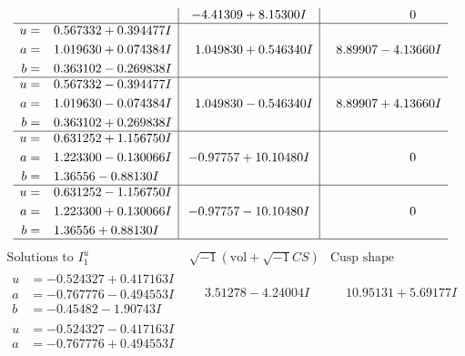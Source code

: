 \documentclass[1p]{elsarticle_modified}
\theoremstyle{definition}
\newcommand{\I}{\sqrt{-1}}
\begin{document}
$$\begin{array}{c|c|c}
 & -4.41309 + 8.15300 I & \phantom{-0.000000 } 0 \\ \hline\begin{aligned}
u &= \phantom{-}0.567332 + 0.394477 I \\
a &= \phantom{-}1.019630 + 0.074384 I \\
b &= \phantom{-}0.363102 - 0.269838 I\end{aligned}
 & \phantom{-}1.049830 + 0.546340 I & \phantom{-}8.89907 - 4.13660 I \\ \hline\begin{aligned}
u &= \phantom{-}0.567332 - 0.394477 I \\
a &= \phantom{-}1.019630 - 0.074384 I \\
b &= \phantom{-}0.363102 + 0.269838 I\end{aligned}
 & \phantom{-}1.049830 - 0.546340 I & \phantom{-}8.89907 + 4.13660 I \\ \hline\begin{aligned}
u &= \phantom{-}0.631252 + 1.156750 I \\
a &= \phantom{-}1.223300 - 0.130066 I \\
b &= \phantom{-}1.36556 - 0.88130 I\end{aligned}
 & -0.97757 + 10.10480 I & \phantom{-0.000000 } 0 \\ \hline\begin{aligned}
u &= \phantom{-}0.631252 - 1.156750 I \\
a &= \phantom{-}1.223300 + 0.130066 I \\
b &= \phantom{-}1.36556 + 0.88130 I\end{aligned}
 & -0.97757 - 10.10480 I & \phantom{-0.000000 } 0\\
 \hline 
 \end{array}$$\newpage$$\begin{array}{c|c|c}  
\text{Solutions to }I^u_{1}& \I (\text{vol} + \sqrt{-1}CS) & \text{Cusp shape}\\
 \hline 
\begin{aligned}
u &= -0.524327 + 0.417163 I \\
a &= -0.767776 - 0.494553 I \\
b &= -0.45482 - 1.90743 I\end{aligned}
 & \phantom{-}3.51278 - 4.24004 I & \phantom{-}10.95131 + 5.69177 I \\ \hline\begin{aligned}
u &= -0.524327 - 0.417163 I \\
a &= -0.767776 + 0.494553 I \\

\end{aligned}
\end{array}$$
\end{document}
